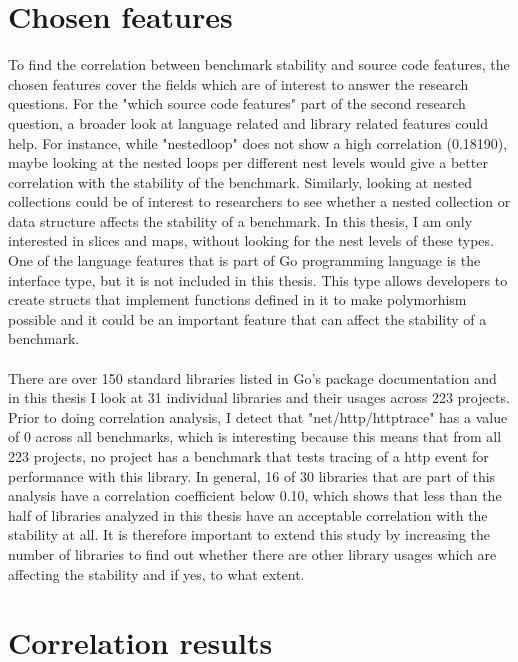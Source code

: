 \documentclass{seal_thesis}
\begin{document}
\section{Chosen features}
\label{chosenfeatures}

To find the correlation between benchmark stability and source code features, the chosen features cover the fields which are of interest to answer the research questions. For the "which source code features" part of the second research question, a broader look at language related and library related features could help. For instance, while "nestedloop" does not show a high correlation (0.18190), maybe looking at the nested loops per different nest levels would give a better correlation with the stability of the benchmark. Similarly, looking at nested collections could be of interest to researchers to see whether a nested collection or data structure affects the stability of a benchmark. In this thesis, I am only interested in slices and maps, without looking for the nest levels of these types. One of the language features that is part of Go programming language is the interface type, but it is not included in this thesis. This type allows developers to create structs that implement functions defined in it to make polymorhism possible and it could be an important feature that can affect the stability of a benchmark.\\
\\
There are over 150 standard libraries listed in Go's package documentation \cite{gopackages} and in this thesis I look at 31 individual libraries and their usages across 223 projects. Prior to doing correlation analysis, I detect that "net/http/httptrace" has a value of 0 across all benchmarks, which is interesting because this means that from all 223 projects, no project has a benchmark that tests tracing of a http event for performance with this library. In general, 16 of 30 libraries that are part of this analysis have a correlation coefficient below 0.10, which shows that less than the half of libraries analyzed in this thesis have an acceptable correlation with the stability at all. It is therefore important to extend this study by increasing the number of libraries to find out whether there are other library usages which are affecting the stability and if yes, to what extent.


\section{Correlation results}
\label{correlationreults}
\end{document}
